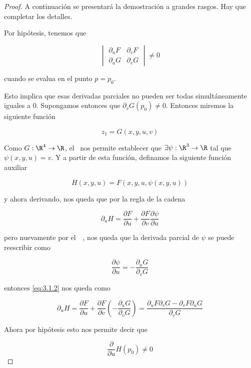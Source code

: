 \begin{proof}
    A continuación se presentará la demostración a grandes rasgos. Hay que completar los detalles.
    
    Por hipótesis, tenemos que
    
    \[
    \renewcommand\arraystretch{2}
    \begin{vmatrix}
        \partial_u F & \partial_v F \\
        \partial_u G & \partial_v G
    \end{vmatrix}
    \neq 0
    \]
    
    \noindent cuando se evalua en el punto $p = p_0$.
    
    Esto implica que esas derivadas parciales no pueden ser todas simultáneamente iguales a $0$. Supongamos entonces que $\partial_v G(p_0) \neq 0$. Entonces miremos la siguiente función
    
    \[
    z_1 = G(x,y,u,v)
    \]
    
    Como $G: \R^4 \rightarrow \R$, el \TFIii~nos permite establecer que $\exists \psi: \R^3 \rightarrow \R$ tal que $\psi(x,y,u) = v$. Y a partir de esta función, definamos la siguiente función auxiliar
    
    \[
    H(x,y,u) = F\left( x,y,u,\psi(x,y,u) \right)
    \]
    
    \noindent y ahora derivando, nos queda que por la regla de la cadena
    
    \begin{equation}\label{eq:3.1.2}
        \partial_u H = \frac{\partial F}{\partial u} + \frac{\partial F}{\partial v} \frac{\partial \psi}{\partial u}
    \end{equation}
    
    \noindent pero nuevamente por el~\TFIii~, nos queda que la derivada parcial de $\psi$ se puede reescribir como
    
    \[
    \frac{\partial \psi}{\partial u} = - \frac{\partial_u G}{\partial_v G}
    \]
    
    \noindent entonces \ref{eq:3.1.2} nos queda como
    
    \[
    \partial_u H = \frac{\partial F}{\partial u} + \frac{\partial F}{\partial v} \left( -\frac{\partial_u G}{\partial_v G} \right) = \frac{\partial_uF \partial_vG - \partial_vF \partial_uG}{\partial_vG}
    \]
    
    Ahora por hipótesis esto nos permite decir que
    
    \[
    \frac{\partial}{\partial u} H(p_0) \neq 0
    \]
    

\end{proof}
